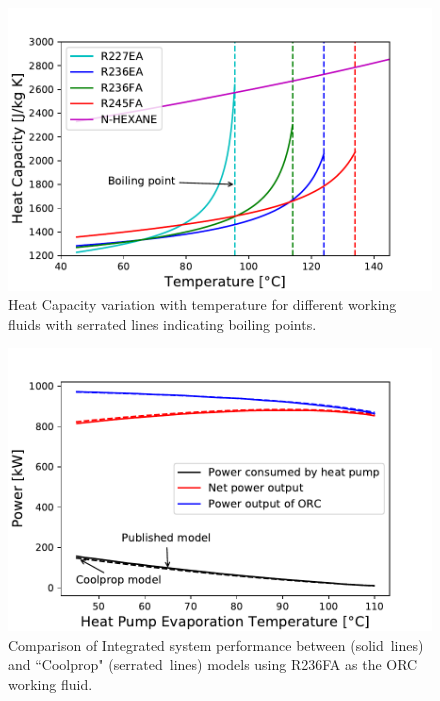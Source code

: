\documentclass[a4paper,12pt]{article}
\begin{document}
 \begin{figure}[H]
  \centering
  \includegraphics[scale = 0.65]{Images/CP.pdf}
  \caption{Heat Capacity variation with temperature for different working fluids with serrated lines indicating boiling points.}
  \label{fig:CP}
\end{figure}
 \begin{figure}[H]
  \centering
  \includegraphics[scale = 0.65]{Images/Int_R236FA.pdf}
  \caption{Comparison of Integrated system performance between \cite{YU2018330} (solid~lines) and ``Coolprop" (serrated~lines) models using R236FA as the ORC working fluid.}
  \label{fig:IntR236FA}
\end{figure}
\end{document}
